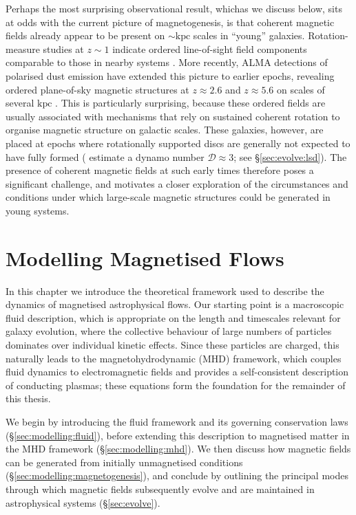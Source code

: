 \documentclass[12pt,twoside]{extreport}
\providecommand{\DIFaddtex}[1]{{\protect\color{DIFgreen}\uwave{#1}}} %
\providecommand{\DIFaddbegin}{} %
\providecommand{\DIFaddend}{} %
\providecommand{\DIFadd}[1]{\texorpdfstring{\DIFaddtex{#1}}{#1}} %
\providecommand{\DIFaddincludegraphics}[2][]{{\color{DIFgreen}\fbox{\DIFOincludegraphics[#1]{#2}}}} %
\DeclareRobustCommand{\DIFaddbegin}{\DIFOaddbegin \let\includegraphics\DIFaddincludegraphics} %
\DeclareRobustCommand{\DIFaddend}{\DIFOaddend \let\includegraphics\DIFOincludegraphics} %
\begin{document}
Perhaps the most surprising observational result, which\DIFaddbegin \DIFadd{, }\DIFaddend as we discuss below, sits at odds with the current picture of magnetogenesis, is that coherent magnetic fields already appear to be present on $\sim\mathrm{kpc}$ scales in ``young'' galaxies. Rotation-measure studies at $z \sim 1$ indicate ordered line-of-sight field components comparable to those in nearby systems \citep{bernet2008strong, sur2018faraday}. More recently, ALMA detections of polarised dust emission have extended this picture to earlier epochs, revealing ordered plane-of-sky magnetic structures at $z \approx 2.6$ and $z \approx 5.6$ on scales of several $\mathrm{kpc}$ \citep{geach2023polarized, chen2024kiloparsec}. This is particularly surprising, because these ordered fields are usually associated with mechanisms that rely on sustained coherent rotation to organise magnetic structure on galactic scales. These galaxies, however, are placed at epochs where rotationally supported discs are generally not expected to have fully formed (\citealt{geach2023polarized} estimate a dynamo number $\mathcal{D} \approx 3$; see \S\ref{sec:evolve:lsd}). The presence of coherent magnetic fields at such early times therefore poses a significant challenge, and motivates a closer exploration of the circumstances and conditions under which large-scale magnetic structures could be generated in young systems.


\section{Modelling Magnetised Flows}
\label{sec:modelling}

In this chapter we introduce the theoretical framework used to describe the dynamics of magnetised astrophysical flows. Our starting point is a macroscopic fluid description, which is appropriate on the length and timescales relevant for galaxy evolution, where the collective behaviour of large numbers of particles dominates over individual kinetic effects. Since these particles are charged, this naturally leads to the magnetohydrodynamic (MHD) framework, which couples fluid dynamics to electromagnetic fields and provides a self-consistent description of conducting plasmas; these equations form the foundation for the remainder of this thesis.

We begin by introducing the fluid framework and its governing conservation laws (\S\ref{sec:modelling:fluid}), before extending this description to magnetised matter in the MHD framework (\S\ref{sec:modelling:mhd}). We then discuss how magnetic fields can be generated from initially unmagnetised conditions (\S\ref{sec:modelling:magnetogenesis}), and conclude by outlining the principal modes through which magnetic fields subsequently evolve and are maintained in astrophysical systems (\S\ref{sec:evolve}).
\end{document}
